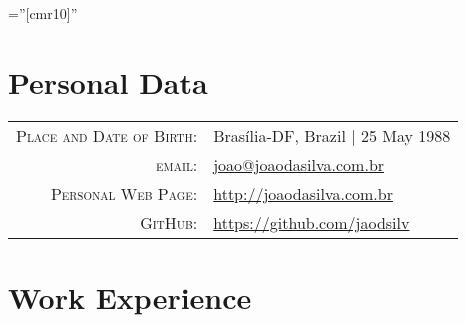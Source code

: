 \documentclass[a4paper,10pt]{article} %
\begin{document}
\pagestyle{empty} %

\font\fb=''[cmr10]'' %


\par{\bigskip\par} %

\section{Personal Data}

\begin{tabular}{rl}
\textsc{Place and Date of Birth:} & Brasília-DF, Brazil | 25 May 1988 \\
\textsc{email:} & \href{mailto:joao@joaodasilva.com.br}{joao@joaodasilva.com.br}\\

\textsc{Personal Web Page:} & \href{http://joaodasilva.com.br}{http://joaodasilva.com.br}\\
\textsc{GitHub:} & \href{https://github.com/jaodsilv}{https://github.com/jaodsilv}\\
\end{tabular}



\section{Work Experience}
\end{document}
